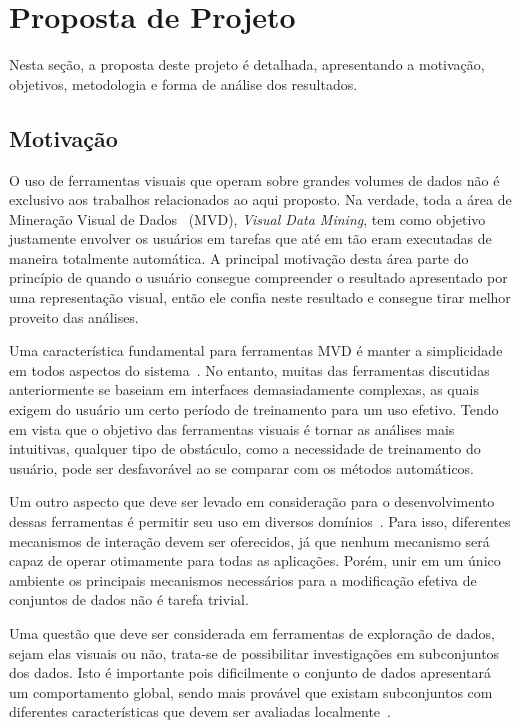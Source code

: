 \section{Proposta de Projeto}

Nesta seção, a proposta deste projeto é detalhada, apresentando a motivação, objetivos, metodologia e forma de análise dos resultados.

\subsection{Motivação}

O uso de ferramentas visuais que operam sobre grandes
volumes de dados não é exclusivo aos trabalhos relacionados
ao aqui proposto. Na verdade, toda a área de
Mineração Visual de Dados~\cite{Wong1999} (MVD),
\emph{Visual Data Mining}, tem como objetivo justamente
envolver os usuários em tarefas que até em tão eram
executadas de maneira totalmente automática. A principal
motivação desta área parte do princípio de quando o usuário
consegue compreender o resultado apresentado por uma
representação visual, então ele confia neste resultado e
consegue tirar melhor proveito das análises.

Uma característica fundamental para ferramentas MVD é manter
a simplicidade em todos aspectos do sistema~\cite{Wong1999}.
No entanto, muitas das ferramentas discutidas anteriormente
se baseiam em interfaces demasiadamente complexas, as quais
exigem do usuário um certo período de treinamento para um
uso efetivo. Tendo em vista que o objetivo das ferramentas
visuais é tornar as análises mais intuitivas, qualquer tipo
de obstáculo, como a necessidade de treinamento do usuário,
pode ser desfavorável ao se comparar com os métodos
automáticos.

Um outro aspecto que deve ser levado em consideração para o
desenvolvimento dessas ferramentas é permitir seu uso em
diversos domínios~\cite{Wong1999}. Para isso, diferentes
mecanismos de interação devem ser oferecidos, já que nenhum
mecanismo será capaz de operar otimamente para todas as
aplicações. Porém, unir em um único ambiente os principais
mecanismos necessários para a modificação efetiva de
conjuntos de dados não é tarefa trivial.

Uma questão que deve ser considerada em ferramentas de
exploração de dados, sejam elas visuais ou não, trata-se de
possibilitar investigações em subconjuntos dos dados. Isto é
importante pois dificilmente o conjunto de dados apresentará
um comportamento global, sendo mais provável que existam
subconjuntos com diferentes características que devem ser
avaliadas localmente~\cite{May2011}.

